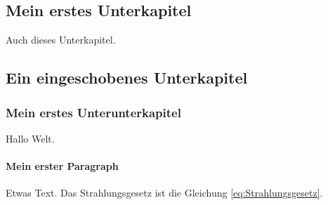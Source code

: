 \documentclass{article}
\begin{document}
\subsection{Mein erstes Unterkapitel}
Auch dieses Unterkapitel.
\subsection{Ein eingeschobenes Unterkapitel}
\subsubsection{Mein erstes Unterunterkapitel}	
Hallo Welt.
\paragraph{Mein erster Paragraph} Etwas Text. Das Strahlungsgesetz ist die Gleichung \eqref{eq:Strahlungsgesetz}.
\end{document}
